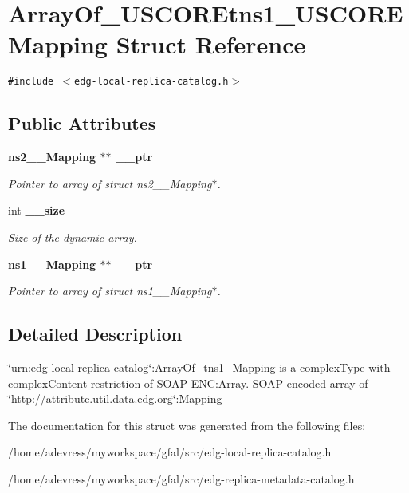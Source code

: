 \section{Array\-Of\_\-USCOREtns1\_\-USCOREMapping Struct Reference}
\label{structArrayOf__USCOREtns1__USCOREMapping}
{\tt \#include $<$edg-local-replica-catalog.h$>$}

\subsection*{Public Attributes}
\begin{CompactItemize}
\item 
\bf{ns2\_\-\_\-Mapping} $\ast$$\ast$ \bf{\_\-\_\-ptr}\label{structArrayOf__USCOREtns1__USCOREMapping_4378767e5140607e9f8e17537a995a1d}

\begin{CompactList}\small\item\em Pointer to array of struct ns2\_\-\_\-Mapping$\ast$. \item\end{CompactList}\item 
int \bf{\_\-\_\-size}\label{structArrayOf__USCOREtns1__USCOREMapping_36d7896ff6354a1474c7aa4d357172f7}

\begin{CompactList}\small\item\em Size of the dynamic array. \item\end{CompactList}\item 
\bf{ns1\_\-\_\-Mapping} $\ast$$\ast$ \bf{\_\-\_\-ptr}\label{structArrayOf__USCOREtns1__USCOREMapping_aba21126fb8acacfdb80635288b6e4ee}

\begin{CompactList}\small\item\em Pointer to array of struct ns1\_\-\_\-Mapping$\ast$. \item\end{CompactList}\end{CompactItemize}


\subsection{Detailed Description}
\char`\"{}urn:edg-local-replica-catalog\char`\"{}:Array\-Of\_\-tns1\_\-Mapping is a complex\-Type with complex\-Content restriction of SOAP-ENC:Array. SOAP encoded array of \char`\"{}http://attribute.util.data.edg.org\char`\"{}:Mapping 



The documentation for this struct was generated from the following files:\begin{CompactItemize}
\item 
/home/adevress/myworkspace/gfal/src/edg-local-replica-catalog.h\item 
/home/adevress/myworkspace/gfal/src/edg-replica-metadata-catalog.h\end{CompactItemize}
